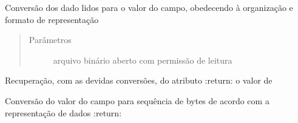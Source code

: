 \documentclass[letterpaper,10pt,brazil]{sphinxmanual}
\begin{document}
\begin{fulllineitems}
\begin{fulllineitems}
\begin{quote}
\begin{description}
\end{description}\end{quote}

\end{fulllineitems}


\begin{fulllineitems}
\label{\detokenize{index:estrutarq.campo.campo_comum.CampoBasico.leia}}
\pysigstartsignatures
{}
\pysigstopsignatures
\sphinxAtStartPar
Conversão dos dado lidos para o valor do campo, obedecendo à
organização e formato de representação
\begin{quote}\begin{description}
\item[{Parâmetros}] \leavevmode
\sphinxAtStartPar
{} \textendash{} arquivo binário aberto com permissão de leitura

\end{description}\end{quote}

\end{fulllineitems}


\begin{fulllineitems}
\label{\detokenize{index:estrutarq.campo.campo_comum.CampoBasico.valor}}
\pysigstartsignatures
{}
\pysigstopsignatures
\sphinxAtStartPar
Recuperação, com as devidas conversões, do atributo 
:return: o valor de 

\end{fulllineitems}


\begin{fulllineitems}
\label{\detokenize{index:estrutarq.campo.campo_comum.CampoBasico.valor_para_bytes}}
\pysigstartsignatures
{}
\pysigstopsignatures
\sphinxAtStartPar
Conversão do valor do campo para sequência de bytes de acordo
com a representação de dados
:return:


\end{fulllineitems}
\end{fulllineitems}
\end{document}
